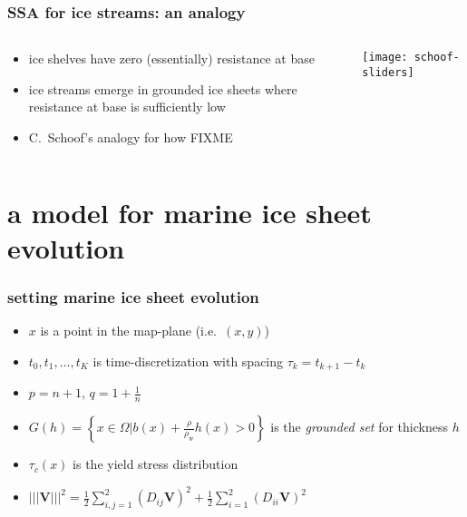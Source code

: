 \documentclass{beamer}
\begin{document}
\begin{frame}
  \frametitle{SSA for ice streams: an analogy}

\begin{columns}
\begin{column}{0.6\textwidth}
\begin{itemize}
\item ice shelves have zero (essentially) resistance at base
\item ice streams emerge in grounded ice sheets where resistance at base is sufficiently low
\item C.~Schoof's analogy for how FIXME
\end{itemize}
\end{column}
\begin{column}{0.4\textwidth}
\texttt{[image: schoof-sliders]}
\end{column}
\end{columns}
\end{frame}


\section[marine ice sheets]{a model for marine ice sheet evolution}

\newcommand{\Tnorm}[1]{\left|\!\left|\!\left|#1\right|\!\right|\!\right|}
\newcommand{\rhow}{\rho_{\text{w}}}
\newcommand{\Wq}{W^{1,q}(\Omega)}
\newcommand{\half}{\frac12}

\begin{frame}
  \frametitle{setting marine ice sheet evolution}

\begin{itemize}
\item $x$ is a point in the map-plane (i.e.~$(x,y)$)
\item $t_0,t_1,\dots,t_K$ is time-discretization with spacing $\tau_k = t_{k+1}-t_k$
\item $p = n+1$, $q = 1 + \frac{1}{n}$
\item $G(h) = \left\{x \in \Omega \Big| b(x) + \frac{\rho}{\rhow} h(x) > 0\right\}$ is the \emph{grounded set} for thickness $h$
\item $\tau_c(x)$ is the yield stress distribution
\item $\Tnorm{\mathbf{V}}^2 = \frac{1}{2} \sum_{i,j=1}^2 (D_{ij} \mathbf{V})^2 + \frac{1}{2} \sum_{i=1}^2 (D_{ii} \mathbf{V})^2$
\end{itemize}
\end{frame}
\end{document}
